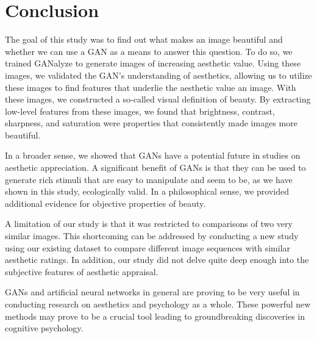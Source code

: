 \documentclass[../main.tex]{subfiles}
\begin{document}
\section{Conclusion}
The goal of this study was to find out what makes an image beautiful and whether we can use a GAN as a means to answer this question. To do so, we trained GANalyze to generate images of increasing aesthetic value. Using these images, we validated the GAN's understanding of aesthetics, allowing us to utilize these images to find features that underlie the aesthetic value an image. With these images, we constructed a so-called visual definition of beauty. By extracting low-level features from these images, we found that brightness, contrast, sharpness, and saturation were properties that consistently made images more beautiful.

In a broader sense, we showed that GANs have a potential future in studies on aesthetic appreciation. A significant benefit of GANs is that they can be used to generate rich stimuli that are easy to manipulate and seem to be, as we have shown in this study, ecologically valid. In a philosophical sense, we provided additional evidence for objective properties of beauty.

A limitation of our study is that it was restricted to comparisons of two very similar images. This shortcoming can be addressed by conducting a new study using our existing dataset to compare different image sequences with similar aesthetic ratings. In addition, our study did not delve quite deep enough into the subjective features of aesthetic appraisal.

GANs and artificial neural networks in general are proving to be very useful in conducting research on aesthetics and psychology as a whole. These powerful new methods may prove to be a crucial tool leading to groundbreaking discoveries in cognitive psychology.
\end{document}
